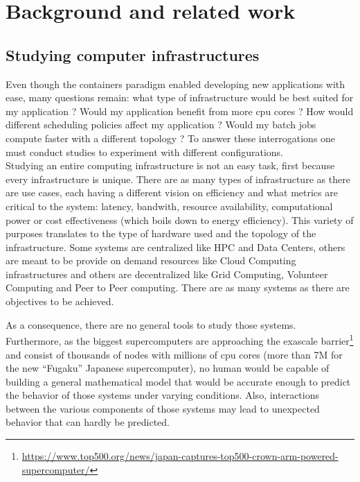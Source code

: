 \chapter{Background and related work}


\section{Studying computer infrastructures} \label{study-computing-infra}

Even though the containers paradigm enabled developing new applications with
ease, many questions remain: what type of infrastructure would be best suited
for my application ? Would my application benefit from more cpu cores ? How would
different scheduling policies affect my application ? Would my batch jobs
compute faster with a different topology ? To answer these interrogations one
must conduct studies to experiment with different configurations.\\

Studying an entire computing infrastructure is not an easy task, first because
every infrastructure is unique. There are as many types of infrastructure as
there are use cases, each having a different vision on efficiency and what
metrics are critical to the system: latency, bandwith, resource availability,
computational power or cost effectiveness (which boils down to energy
efficiency). This variety of purposes translates to the type of hardware used
and the topology of the infrastructure. Some systems are centralized like HPC
and Data Centers, others are meant to be provide on demand resources like Cloud
Computing infrastructures and others are decentralized like Grid Computing,
Volunteer Computing and Peer to Peer computing. There are as many systems as
there are objectives to be achieved.

As a consequence, there are no general tools to study those systems.
Furthermore, as the biggest supercomputers are approaching the exascale
barrier\footnote{\url{https://www.top500.org/news/japan-captures-top500-crown-arm-powered-supercomputer/}}
and consist of thousands of nodes with millions of cpu cores (more than 7M for
the new ``Fugaku'' Japanese supercomputer), no human would be capable of
building a general mathematical model that would be accurate enough to predict
the behavior of those systems under varying conditions. Also, interactions
between the various components of those systems may lead to unexpected
behavior \cite{10.1007/978-3-319-09873-9_12} that can hardly be predicted.

